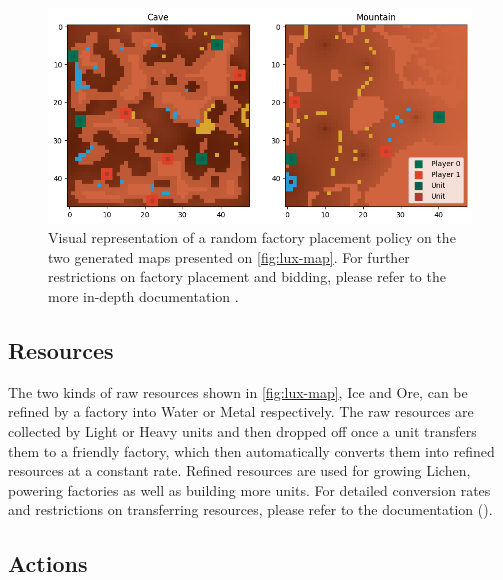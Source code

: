         \begin{figure}[htbp]
            \centering
            \includegraphics[width=0.62\linewidth]{images/intro_luxenv/map/factories_units.png}
            \captionsetup{justification=justified, singlelinecheck=false, width=1\linewidth, labelfont=bf}    
            \caption{Visual representation of a random factory placement policy on the two generated maps presented on \textcolor{deepblue}{\autoref{fig:lux-map}}. For further restrictions on factory placement and bidding, please refer to the more in-depth documentation \protect\footnotemark.}
            \label{fig:lux-map2}
        \end{figure}
        
        
    \subsection{Resources}
        
        \noindent The two kinds of raw resources shown in \textcolor{deepblue}{\autoref{fig:lux-map}}, Ice and Ore, can be refined by a factory into Water or Metal respectively. The raw resources are collected by Light or Heavy units and then dropped off once a unit transfers them to a friendly factory, which then automatically converts them into refined resources at a constant rate. Refined resources are used for growing Lichen, powering factories as well as building more units. For detailed conversion rates and restrictions on transferring resources, please refer to the documentation (\textcolor{deepblue}{\cite{lux-ai-season-2}}).



    \subsection{Actions}
    \label{subsec:lux-action}
        
